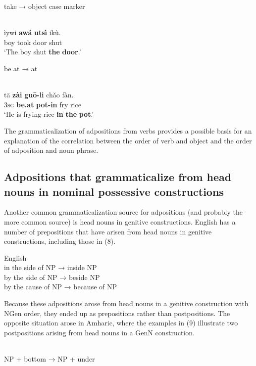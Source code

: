 \documentclass[output=paper]{langsci/langscibook}
\begin{document}
take → object case marker

\ea\label{ex:dryer:}
\\
\gll     ìywi  \textbf{awá}  \textbf{utsì}  ikù.\\
         boy  took  door  shut\\
\glt     ‘The boy shut \textbf{the} \textbf{door}.’
\z

be at → at

\ea\label{ex:dryer:}
\\
\gll     tā  \textbf{zài}  \textbf{guō-li}  chǎo  fàn.\\
         3\textsc{sg}  \textbf{be.at}  \textbf{pot-in}  fry  rice\\
\glt     ‘He is frying rice \textbf{in} \textbf{the} \textbf{pot}.’
\z

The grammaticalization of adpositions from verbs provides a possible basis for an explanation of the correlation between the order of verb and object and the order of adposition and noun phrase.

\subsection{Adpositions that grammaticalize from head nouns in nominal possessive constructions}

Another common grammaticalization source for adpositions (and probably the more common source) is head nouns in genitive constructions. English has a number of prepositions that have arisen from head nouns in genitive constructions, including those in (8).

\ea
{English}\\
\ea in the side of NP → inside NP\\
\ex by the side of NP → beside NP\\
\ex by the cause of NP → because of NP\\
\z
\z

Because these adpositions arose from head nouns in a genitive construction with NGen order, they ended up as prepositions rather than postpositions. The opposite situation arose in Amharic, where the examples in (9) illustrate two postpositions arising from head nouns in a GenN construction.

\ea\label{ex:dryer:}
 \\
\ea
NP + bottom → NP + under\\
\end{document}
